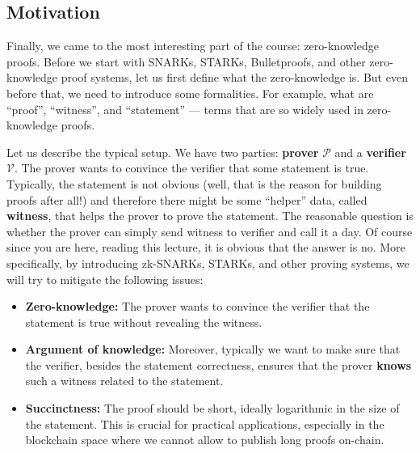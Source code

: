\documentclass[../lecture-notes.tex]{subfiles}
\begin{document}
\subsection{Motivation}

Finally, we came to the most interesting part of the course: zero-knowledge proofs. Before we start with SNARKs, 
STARKs, Bulletproofs, and other zero-knowledge proof systems, let us first define what the zero-knowledge is. But even before 
that, we need to introduce some formalities. For example, what are ``proof'', ``witness'', and ``statement'' --- terms that are so widely used in zero-knowledge proofs.

Let us describe the typical setup. We have two parties: \textbf{prover} $\mathcal{P}$ and a \textbf{verifier} $\mathcal{V}$. The prover wants to convince the verifier that some statement is true. Typically, the statement is not obvious (well, that is the reason for building proofs after all!) and therefore there might be some ``helper'' data, called \textbf{witness}, that helps the prover to prove the statement. The reasonable question is whether the prover can simply send witness to verifier and call it a day. Of course since you are here, reading this lecture, it is obvious that the answer is no. More specifically, by introducing zk-SNARKs, STARKs, and other proving systems, we will try to mitigate the following issues:
\begin{itemize}
    \item \textbf{Zero-knowledge:} The prover wants to convince the verifier that the statement is true without revealing the witness. 
    \item \textbf{Argument of knowledge:} Moreover, typically we want to make sure that the verifier, besides the statement correctness, ensures that the prover \textbf{knows} such a witness related to the statement.
    \item \textbf{Succinctness:} The proof should be short, ideally logarithmic in the size of the statement. This is crucial for practical applications, especially in the blockchain space where we cannot allow to publish long proofs on-chain.
\end{itemize}
\end{document}
